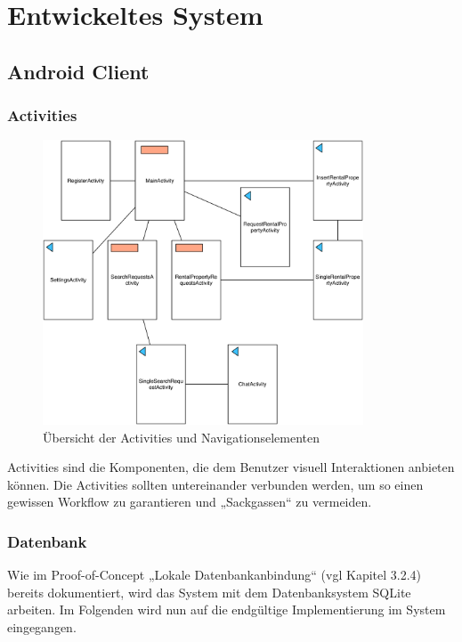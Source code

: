 
\section{Entwickeltes System}


\subsection{Android Client}

\subsubsection{Activities}

\begin{figure}[H]
	\centering
	\includegraphics[width=0.85\textwidth]{./images/activitiesoverview.png}
	\caption{Übersicht der Activities und Navigationselementen}
	\label{fg:activitiesoverview}
\end{figure}

Activities sind die Komponenten, die dem Benutzer visuell Interaktionen anbieten können. Die Activities sollten untereinander verbunden werden, um so einen gewissen Workflow zu garantieren und „Sackgassen“ zu vermeiden.

\subsubsection{Datenbank}

Wie im Proof-of-Concept „Lokale Datenbankanbindung“ (vgl Kapitel 3.2.4) bereits dokumentiert, wird das System mit dem Datenbanksystem SQLite arbeiten. Im Folgenden wird nun auf die endgültige Implementierung im System eingegangen.

